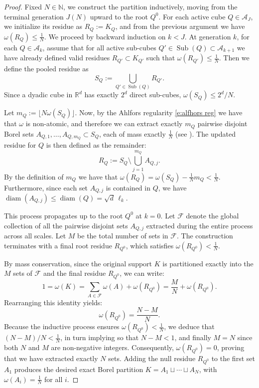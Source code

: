 \documentclass[12pt,a4paper,oneside]{amsart}
\theoremstyle{plain}
\theoremstyle{definition}
\numberwithin{equation}{section}
\numberwithin{figure}{section}
\numberwithin{table}{section}
\theoremstyle{remark}
\newcommand{\N}{\mathbb{N}}
\begin{document}
\begin{proof}
Fixed $N\in \N$, we construct the partition inductively, moving from the terminal generation $J(N)$ upward to the root $Q^0$. For each active cube $Q \in \mathcal{A}_J$, we initialize its residue as $R_Q := K_Q$, and from the previous argument we have $\omega(R_Q)\leq \frac1N$. We proceed by backward induction on $k < J$. At generation $k$, for each $Q \in \mathcal{A}_k$, assume that for all active sub-cubes $Q' \in \operatorname{Sub}(Q) \subset \mathcal{A}_{k+1}$ we have already defined valid residues $R_{Q'} \subset K_{Q'}$ such that $\omega(R_{Q'}) \le \frac1N$. Then we define the pooled residue as
\begin{equation*}
    S_Q := \bigcup_{Q'\in\operatorname{Sub}(Q)} R_{Q'}.
\end{equation*}
Since a dyadic cube in $\mathbb{R}^d$ has exactly $2^d$ direct sub-cubes, $\omega(S_Q) \le 2^d / N$.

Let $m_Q := \lfloor N\omega(S_Q) \rfloor$. Now, by the Ahlfors regularity \eqref{e:alfhors reg} we have that $\omega$ is non-atomic, and therefore we can extract exactly $m_Q$ pairwise disjoint Borel sets $A_{Q,1}, \dots, A_{Q,m_Q} \subset S_Q$, each of mass exactly $\frac1N$ (see \cite[Corollary 1.21]{fonseca2007}). The updated residue for $Q$ is then defined as the remainder:
\begin{equation*}
    R_Q := S_Q \setminus \bigcup_{j=1}^{m_Q} A_{Q,j}.
\end{equation*}
By the definition of $m_Q$ we have that $\omega(R_Q) = \omega(S_Q) - \frac{1}{N}m_Q < \frac1N$. Furthermore, since each set $A_{Q,j}$ is contained in $Q$, we have $\operatorname{diam}(A_{Q,j}) \le \operatorname{diam}(Q) = \sqrt{d}\,\ell_k$.

This process propagates up to the root $Q^0$ at $k=0$. Let $\mathcal{F}$ denote the global collection of all the pairwise disjoint sets $A_{Q,j}$ extracted during the entire process across all scales. Let $M$ be the total number of sets in $\mathcal{F}$. The construction terminates with a final root residue $R_{Q^0}$, which satisfies $\omega(R_{Q^0}) < \frac1N$.

By mass conservation, since the original support $K$ is partitioned exactly into the $M$ sets of $\mathcal{F}$ and the final residue $R_{Q^0}$, we can write:
\begin{equation*}
    1 = \omega(K) = \sum_{A \in \mathcal{F}} \omega(A) + \omega(R_{Q^0}) = \frac MN + \omega(R_{Q^0}).
\end{equation*}
Rearranging this identity yields:
\begin{equation*}
    \omega(R_{Q^0}) = \frac{N - M}{N}.
\end{equation*}
Because the inductive process ensures $\omega(R_{Q^0}) < \frac1N$, we deduce that $(N - M)/N < \frac1N$, in turn implying so that $N - M < 1$, and finally $M = N$ since both $N$ and $M$ are non-negative integers.
Consequently, $\omega(R_{Q^0}) = 0$, proving that we have extracted exactly $N$ sets. Adding the null residue $R_{Q^0}$ to the first set $A_1$ produces the desired exact Borel partition $K = A_1 \sqcup \cdots \sqcup A_N$, with $\omega(A_i) = \frac1N$ for all $i$.



\end{proof}
\end{document}
